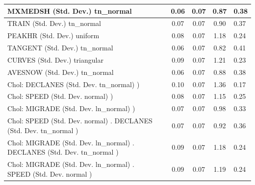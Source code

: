 \begin{table}
\begin{center}
\begin{tabular}{|l|l|c|c|c|l|}
			\hline
			MXMEDSH (Std. Dev.) tn_normal &  & 0.06 & 0.07 & 0.87 & 0.38 \\
			\hline
			TRAIN (Std. Dev.) tn_normal &  & 0.07 & 0.07 & 0.90 & 0.37 \\
			\hline
			PEAKHR (Std. Dev.) uniform &  & 0.08 & 0.07 & 1.18 & 0.24 \\
			\hline
			TANGENT (Std. Dev.) tn_normal &  & 0.06 & 0.07 & 0.82 & 0.41 \\
			\hline
			CURVES (Std. Dev.) triangular &  & 0.09 & 0.07 & 1.21 & 0.23 \\
			\hline
			AVESNOW (Std. Dev.) tn_normal &  & 0.06 & 0.07 & 0.88 & 0.38 \\
			\hline
			 Chol: DECLANES (Std. Dev. tn_normal) ) &  & 0.10 & 0.07 & 1.36 & 0.17 \\
			\hline
			 Chol: SPEED (Std. Dev. normal) ) &  & 0.08 & 0.07 & 1.15 & 0.25 \\
			\hline
			 Chol: MIGRADE (Std. Dev. ln_normal) ) &  & 0.07 & 0.07 & 0.98 & 0.33 \\
			\hline
			 Chol: SPEED (Std. Dev. normal) . DECLANES (Std. Dev.   tn_normal ) &  & 0.07 & 0.07 & 0.92 & 0.36 \\
			\hline
			 Chol: MIGRADE (Std. Dev. ln_normal) . DECLANES (Std. Dev.   tn_normal ) &  & 0.09 & 0.07 & 1.18 & 0.24 \\
			\hline
			 Chol: MIGRADE (Std. Dev. ln_normal) . SPEED (Std. Dev.   normal ) &  & 0.09 & 0.07 & 1.19 & 0.24 \\
			\hline
		\end{tabular}
	\end{center}
\end{table}